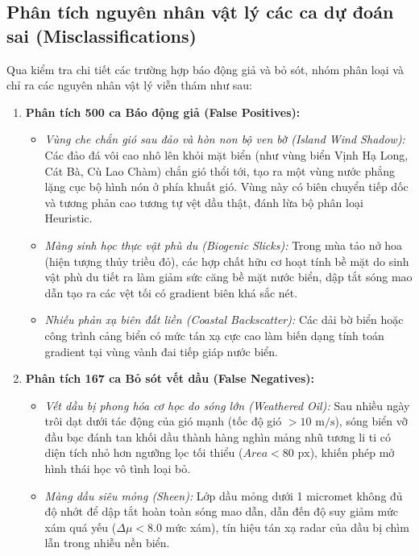 \subsection{Phân tích nguyên nhân vật lý các ca dự đoán sai (Misclassifications)}
Qua kiểm tra chi tiết các trường hợp báo động giả và bỏ sót, nhóm phân loại và chỉ ra các nguyên nhân vật lý viễn thám như sau:

\begin{enumerate}
    \item \textbf{Phân tích 500 ca Báo động giả (False Positives):}
    \begin{itemize}
        \item \textit{Vùng che chắn gió sau đảo và hòn non bộ ven bờ (Island Wind Shadow):} Các đảo đá vôi cao nhô lên khỏi mặt biển (như vùng biển Vịnh Hạ Long, Cát Bà, Cù Lao Chàm) chắn gió thổi tới, tạo ra một vùng nước phẳng lặng cục bộ hình nón ở phía khuất gió. Vùng này có biên chuyển tiếp dốc và tương phản cao tương tự vệt dầu thật, đánh lừa bộ phân loại Heuristic.
        \item \textit{Màng sinh học thực vật phù du (Biogenic Slicks):} Trong mùa tảo nở hoa (hiện tượng thủy triều đỏ), các hợp chất hữu cơ hoạt tính bề mặt do sinh vật phù du tiết ra làm giảm sức căng bề mặt nước biển, dập tắt sóng mao dẫn tạo ra các vệt tối có gradient biên khá sắc nét.
        \item \textit{Nhiễu phản xạ biên đất liền (Coastal Backscatter):} Các dải bờ biển hoặc công trình cảng biển có mức tán xạ cực cao làm biến dạng tính toán gradient tại vùng vành đai tiếp giáp nước biển.
    \end{itemize}

    \item \textbf{Phân tích 167 ca Bỏ sót vết dầu (False Negatives):}
    \begin{itemize}
        \item \textit{Vết dầu bị phong hóa cơ học do sóng lớn (Weathered Oil):} Sau nhiều ngày trôi dạt dưới tác động của gió mạnh (tốc độ gió $> 10 \text{ m/s}$), sóng biển vỡ đầu bạc đánh tan khối dầu thành hàng nghìn mảng nhũ tương li ti có diện tích nhỏ hơn ngưỡng lọc tối thiểu ($Area < 80 \text{ px}$), khiến phép mở hình thái học vô tình loại bỏ.
        \item \textit{Màng dầu siêu mỏng (Sheen):} Lớp dầu mỏng dưới 1 micromet không đủ độ nhớt để dập tắt hoàn toàn sóng mao dẫn, dẫn đến độ suy giảm mức xám quá yếu ($\Delta \mu < 8.0$ mức xám), tín hiệu tán xạ radar của dầu bị chìm lẫn trong nhiễu nền biển.
    \end{itemize}
\end{enumerate}


